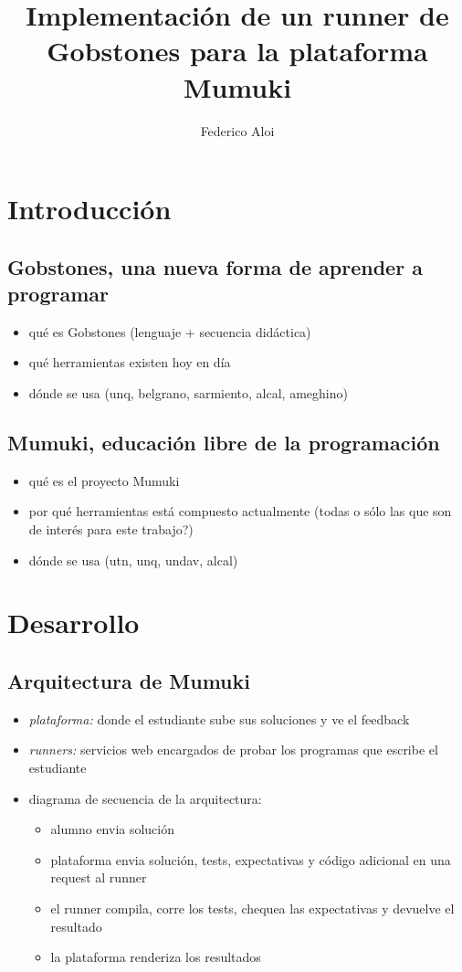 \documentclass[a4paper,10pt]{article}
\title{Implementación de un runner de Gobstones para la plataforma Mumuki}
\author{Federico Aloi}
\newcommand{\borrador}[1]{{\color{blue}{\Large TODO:} {#1}}}
\begin{document}
\maketitle

\section{Introducción}

\subsection{Gobstones, una nueva forma de aprender a programar}
\borrador{
  \begin{itemize}
    \item qué es Gobstones (lenguaje + secuencia didáctica)
    \item qué herramientas existen hoy en día
    \item dónde se usa (unq, belgrano, sarmiento, alcal, ameghino)
  \end{itemize}
}

\subsection{Mumuki, educación libre de la programación}
\borrador{
  \begin{itemize}
    \item qué es el proyecto Mumuki
    \item por qué herramientas está compuesto actualmente (todas o sólo las que son de interés para este trabajo?)
    \item dónde se usa (utn, unq, undav, alcal)
  \end{itemize}
}

\section{Desarrollo}

\subsection{Arquitectura de Mumuki}
\borrador{
  \begin{itemize}
    \item \textit{plataforma:} donde el estudiante sube sus soluciones y ve el feedback
    \item \textit{runners:} servicios web encargados de probar los programas que escribe el estudiante
    \item diagrama de secuencia de la arquitectura:
      \begin{itemize}
        \item alumno envia solución
        \item plataforma envia solución, tests, expectativas y código adicional en una request al runner
        \item el runner compila, corre los tests, chequea las expectativas y devuelve el resultado
        \item la plataforma renderiza los resultados
      \end{itemize}
  \end{itemize}
}
\end{document}
